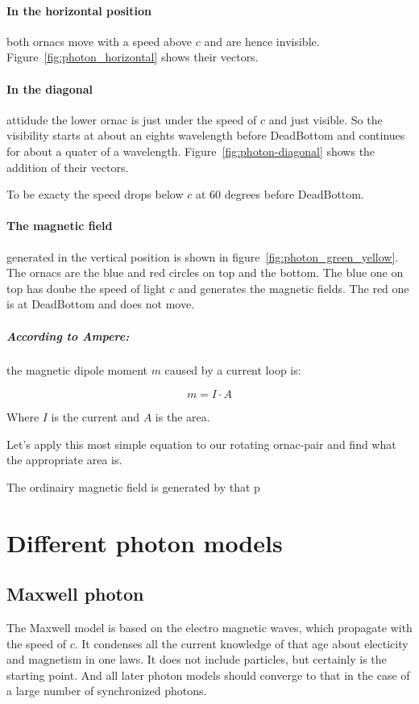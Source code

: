 \paragraph{
In the horizontal position} both ornacs move with a speed above $c$ and are hence invisible.
Figure~\vref{fig:photon_horizontal} shows their vectors.


\paragraph{
In the diagonal} attidude the lower ornac is just under the speed of $c$ and just visible. So the visibility starts at about an eights wavelength before DeadBottom and continues for about a quater of a wavelength. Figure~\vref{fig:photon-diagonal} shows the addition of  their vectors.

To be exacty the speed drops below $c$ at 60 degrees before DeadBottom.


\paragraph{
The magnetic field} generated in the vertical position is shown in 
figure~\vref{fig:photon_green_yellow}. The ornacs are the blue and red circles on top and the bottom. The blue one on top has doube the speed of light $c$ and generates the magnetic fields. The red one is at DeadBottom and does not move. 



\subparagraph{
According to Ampere:} the magnetic dipole moment $m$ caused by a current loop is:


\[ m=I\cdot A  \]

Where $I$ is the current and $A$ is the area.

Let's apply this most simple equation to our rotating ornac-pair and find what the appropriate area is.

The ordinairy magnetic field is generated by that p





\section{Different photon models}

\subsection{Maxwell photon}
The Maxwell model is based on the electro magnetic waves, which propagate with the speed of $c$. It condenses all the current knowledge of that age about electicity and magnetism in one laws. It does not include particles, but certainly is the starting point. And all later photon models should converge to that in the case of a large number of synchronized photons.


